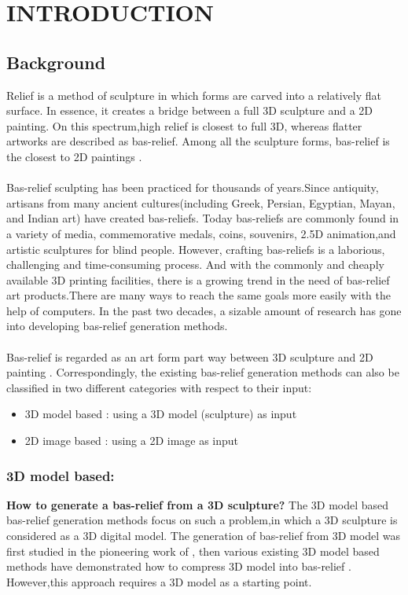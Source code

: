 \chapter{INTRODUCTION}

\section{Background}
Relief is a method of sculpture in which forms are carved into a
relatively flat surface. In essence, it creates a bridge between a full 3D sculpture and a 2D painting. On this spectrum,high relief is closest to full 3D, whereas flatter artworks are described as bas-relief. Among all the sculpture forms, bas-relief is the closest to 2D paintings\cite{kerber2009feature} \cite{barron2012color}.\\ \\
Bas-relief sculpting has been practiced for thousands of years.Since antiquity, artisans from many ancient cultures(including Greek, Persian, Egyptian, Mayan, and Indian art) have created bas-reliefs.
Today bas-reliefs are commonly found in a variety of media, commemorative medals, coins, souvenirs, 2.5D animation,and artistic sculptures for blind people. However, crafting bas-reliefs is a laborious, challenging and time-consuming process. And with the commonly and cheaply available 3D printing facilities, there is a growing trend in the need of bas-relief art products.There are many ways to reach the same goals more easily with the help of computers. In the past two decades, a sizable amount of research has gone into developing bas-relief generation methods\cite{benzaid2017analysis}.\\ \\ 
Bas-relief is regarded as an art form part way between 3D sculpture and 2D painting \cite{benzaid2017analysis}\cite{barron2012color}\cite{weyrich2007digital}\cite{kerber2009feature}\cite{kerber2012computer}. Correspondingly, the existing bas-relief generation methods can also be classified in two different categories with respect to their input\cite{benzaid2017analysis}:
\begin{itemize}
 \item 3D model based : using a 3D model (sculpture) as input 
 \item 2D image based : using a 2D image as input 
\end{itemize} 
\subsection{3D model based:} \textbf{How to generate a bas-relief from a 3D sculpture? }The 3D model based bas-relief generation methods focus on such a problem,in which a 3D sculpture is considered as a 3D digital model.   The generation of bas-relief from 3D model was first studied in the pioneering work of \cite{cignoni1997computer}, then various existing 3D model based methods have demonstrated how to compress 3D model into bas-relief \cite{weyrich2007digital}\cite{kerber2009feature}\cite{song2007automatic}\cite{sun2009bas} . However,this approach requires a 3D model as a starting point.
